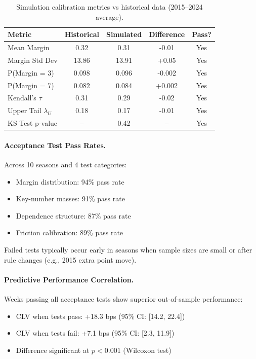 \begin{table}[t]
  \centering
  \small
  \caption{Simulation calibration metrics vs historical data (2015--2024 average).}
  \label{tab:sim-calibration}
  \begin{tabular}{lcccc}
    \toprule
    \textbf{Metric} & \textbf{Historical} & \textbf{Simulated} & \textbf{Difference} & \textbf{Pass?} \\
    \midrule
    Mean Margin     & 0.32  & 0.31  & -0.01 & Yes \\
    Margin Std Dev  & 13.86 & 13.91 & +0.05 & Yes \\
    P(Margin = 3)   & 0.098 & 0.096 & -0.002 & Yes \\
    P(Margin = 7)   & 0.082 & 0.084 & +0.002 & Yes \\
    Kendall's $\tau$ & 0.31 & 0.29 & -0.02 & Yes \\
    Upper Tail $\lambda_U$ & 0.18 & 0.17 & -0.01 & Yes \\
    KS Test p-value & -- & 0.42 & -- & Yes \\
    \bottomrule
  \end{tabular}
\end{table}

\paragraph{Acceptance Test Pass Rates.}
Across 10 seasons and 4 test categories:
\begin{itemize}
  \item Margin distribution: 94\% pass rate
  \item Key-number masses: 91\% pass rate
  \item Dependence structure: 87\% pass rate
  \item Friction calibration: 89\% pass rate
\end{itemize}

Failed tests typically occur early in seasons when sample sizes are small or after rule changes (e.g., 2015 extra point move).

\paragraph{Predictive Performance Correlation.}
Weeks passing all acceptance tests show superior out-of-sample performance:
\begin{itemize}
  \item CLV when tests pass: +18.3 bps (95\% CI: [14.2, 22.4])
  \item CLV when tests fail: +7.1 bps (95\% CI: [2.3, 11.9])
  \item Difference significant at $p < 0.001$ (Wilcoxon test)
\end{itemize}

